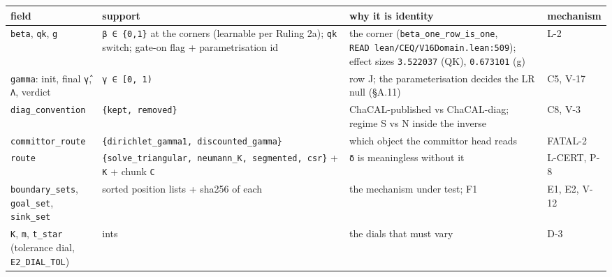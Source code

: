 \documentclass[11pt,a4paper]{article}
\newcounter{none}                 %
\theoremstyle{plain}
\theoremstyle{definition}
\theoremstyle{remark}
\begin{document}
{\def\LTcaptype{none} %
\begin{longtable}[]{@{}
  >{\raggedright\arraybackslash}p{}
  >{\raggedright\arraybackslash}p{}
  >{\raggedright\arraybackslash}p{}
  >{\raggedright\arraybackslash}p{}@{}}
\toprule\noalign{}
\begin{minipage}[b]{\linewidth}\raggedright
field
\end{minipage} & \begin{minipage}[b]{\linewidth}\raggedright
support
\end{minipage} & \begin{minipage}[b]{\linewidth}\raggedright
why it is identity
\end{minipage} & \begin{minipage}[b]{\linewidth}\raggedright
mechanism
\end{minipage} \\
\midrule\noalign{}
\endhead
\bottomrule\noalign{}
\endlastfoot
\texttt{beta}, \texttt{qk}, \texttt{g} & \texttt{β\ ∈\ \{0,1\}} at the
corners (learnable per Ruling 2a); \texttt{qk} switch; gate-on flag +
parametrisation id & the corner (\texttt{beta\_one\_row\_is\_one},
\texttt{READ\ lean/CEQ/V16Domain.lean:509}); effect sizes
\texttt{3.522037} (QK), \texttt{0.673101} (g) & L-2 \\
\texttt{gamma}: init, final \texttt{γ̂}, \texttt{Λ}, verdict &
\texttt{γ\ ∈\ {[}0,\ 1)} & row J; the parameterisation decides the LR
null (§A.11) & C5, V-17 \\
\texttt{diag\_convention} & \texttt{\{kept,\ removed\}} &
ChaCAL-published vs ChaCAL-diag; regime S vs N inside the inverse & C8,
V-3 \\
\texttt{committor\_route} &
\texttt{\{dirichlet\_gamma1,\ discounted\_gamma\}} & which object the
committor head reads & FATAL-2 \\
\texttt{route} &
\texttt{\{solve\_triangular,\ neumann\_K,\ segmented,\ csr\}} +
\texttt{K} + chunk \texttt{C} & \texttt{δ} is meaningless without it &
L-CERT, P-8 \\
\texttt{boundary\_sets}, \texttt{goal\_set}, \texttt{sink\_set} & sorted
position lists + sha256 of each & the mechanism under test; F1 & E1, E2,
V-12 \\
\texttt{K}, \texttt{m}, \texttt{t\_star} (tolerance dial,
\texttt{E2\_DIAL\_TOL}) & ints & the dials that must vary & D-3 \\

\end{longtable}}
\end{document}
